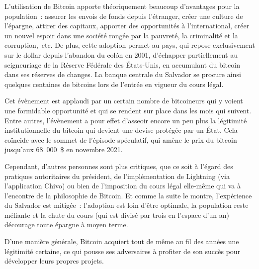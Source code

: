 L'utilisation de Bitcoin apporte théoriquement beaucoup d'avantages pour la population~: assurer les envois de fonds depuis l'étranger, créer une culture de l'épargne, attirer des capitaux, apporter des opportunités à l'international, créer un nouvel espoir dans une société rongée par la pauvreté, la criminalité et la corruption,~etc. De plus, cette adoption permet au pays, qui repose exclusivement sur le dollar depuis l'abandon du colón en 2001, d'échapper partiellement au seigneuriage de la Réserve Fédérale des États-Unis, en accumulant du bitcoin dans ses réserves de changes. La banque centrale du Salvador se procure ainsi quelques centaines de bitcoins lors de l'entrée en vigueur du cours légal.

Cet évènement est applaudi par un certain nombre de bitcoineurs qui y voient une formidable opportunité et qui se rendent sur place dans les mois qui suivent. Entre autres, l'évènement a pour effet d'asseoir encore un peu plus la légitimité institutionnelle du bitcoin qui devient une devise protégée par un État. Cela coïncide avec le sommet de l'épisode spéculatif, qui amène le prix du bitcoin jusqu'aux 68~000~\$ en novembre 2021.

Cependant, d'autres personnes sont plus critiques, que ce soit à l'égard des pratiques autoritaires du président, de l'implémentation de Lightning (via l'application Chivo) ou bien de l'imposition du cours légal elle-même qui va à l'encontre de la philosophie de Bitcoin. Et comme la suite le montre, l'expérience du Salvador est mitigée~: l'adoption est loin d'être optimale, la population reste méfiante et la chute du cours (qui est divisé par trois en l'espace d'un an) décourage toute épargne à moyen terme.

D'une manière générale, Bitcoin acquiert tout de même au fil des années une légitimité certaine, ce qui pousse ses adversaires à profiter de son succès pour développer leurs propres projets.


